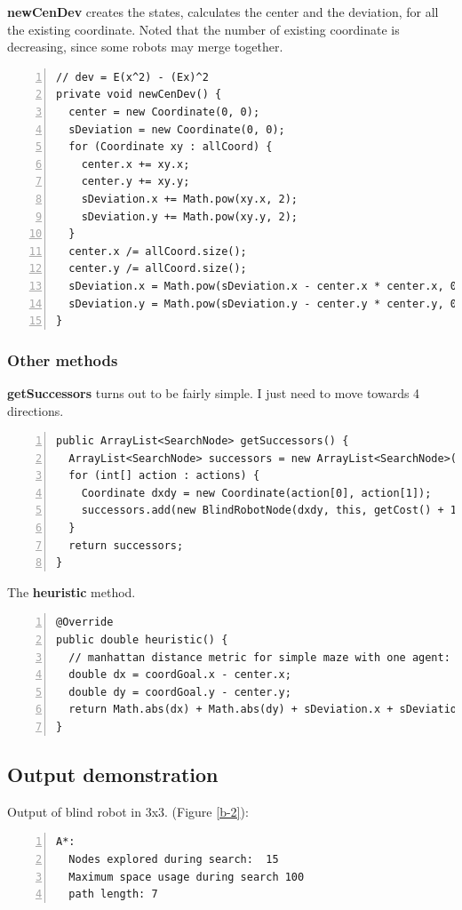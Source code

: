 \textbf{newCenDev} creates the states, calculates the center and the deviation, for all the existing coordinate. Noted that the number of existing coordinate is decreasing, since some robots may merge together.
\begin{lstlisting}[numbers=left]
// dev = E(x^2) - (Ex)^2
private void newCenDev() {
  center = new Coordinate(0, 0);
  sDeviation = new Coordinate(0, 0);
  for (Coordinate xy : allCoord) {
    center.x += xy.x;
    center.y += xy.y;
    sDeviation.x += Math.pow(xy.x, 2);
    sDeviation.y += Math.pow(xy.y, 2);
  }
  center.x /= allCoord.size();
  center.y /= allCoord.size();
  sDeviation.x = Math.pow(sDeviation.x - center.x * center.x, 0.5);
  sDeviation.y = Math.pow(sDeviation.y - center.y * center.y, 0.5);
}
\end{lstlisting}

\subsubsection{Other methods}

\textbf{getSuccessors} turns out to be fairly simple. I just need to move towards 4 directions. 
\begin{lstlisting}[numbers=left]
public ArrayList<SearchNode> getSuccessors() {
  ArrayList<SearchNode> successors = new ArrayList<SearchNode>();
  for (int[] action : actions) {
    Coordinate dxdy = new Coordinate(action[0], action[1]);
    successors.add(new BlindRobotNode(dxdy, this, getCost() + 1.0));
  }
  return successors;
}
\end{lstlisting}

The \textbf{heuristic} method.
\begin{lstlisting}[numbers=left]
@Override
public double heuristic() {
  // manhattan distance metric for simple maze with one agent:
  double dx = coordGoal.x - center.x;
  double dy = coordGoal.y - center.y;
  return Math.abs(dx) + Math.abs(dy) + sDeviation.x + sDeviation.y;
}
\end{lstlisting}











\subsection{Output demonstration}

Output of blind robot in 3x3. (Figure \ref{b-2}):
\begin{lstlisting}[numbers=left]
A*:  
  Nodes explored during search:  15
  Maximum space usage during search 100
  path length: 7
\end{lstlisting}

